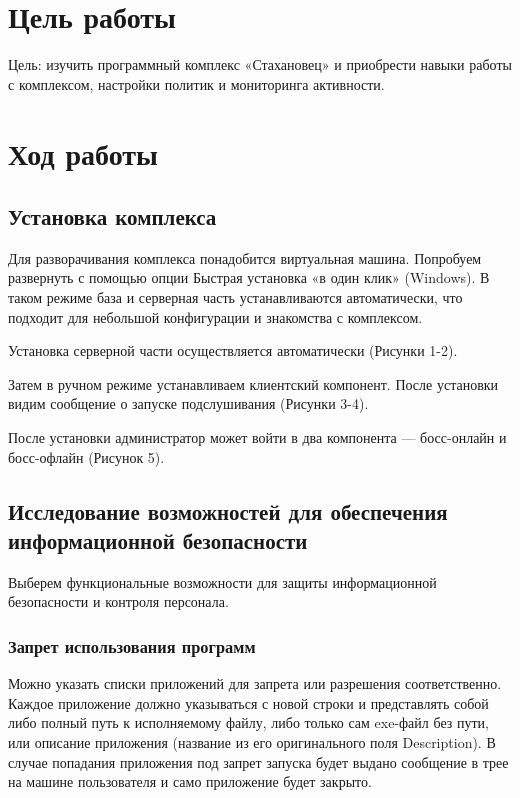 \section{Цель работы}
Цель: изучить программный комплекс «Стахановец» и приобрести навыки работы с комплексом, настройки политик и мониторинга активности. 

\section{Ход работы}
\subsection{Установка комплекса}
Для разворачивания комплекса понадобится виртуальная машина. Попробуем развернуть с помощью опции Быстрая установка «в один клик» (Windows). В таком режиме база и серверная часть устанавливаются автоматически, что подходит для небольшой конфигурации и знакомства с комплексом.

Установка серверной части осуществляется автоматически (Рисунки 1-2).
\FloatBarrier

Затем в ручном режиме устанавливаем клиентский компонент. После установки видим сообщение о запуске подслушивания (Рисунки 3-4). 

\FloatBarrier

После установки администратор может войти в два компонента — босс-онлайн и босс-офлайн (Рисунок 5).
\FloatBarrier
\clearpage


\subsection{Исследование возможностей для обеспечения информационной безопасности}
Выберем функциональные возможности для защиты информационной безопасности и контроля персонала.

\subsubsection{Запрет использования программ}

Можно указать списки приложений для запрета или разрешения соответственно. Каждое приложение должно указываться с новой строки и представлять собой либо полный путь к исполняемому файлу, либо только сам exe-файл без пути, или описание приложения (название из его оригинального поля Description). В случае попадания приложения под запрет запуска будет выдано сообщение в трее на машине пользователя и само приложение будет закрыто. 


